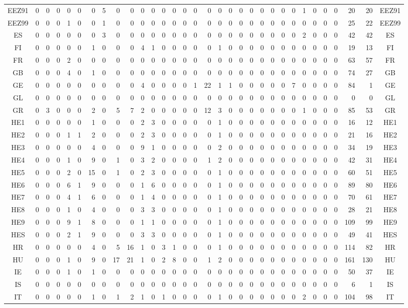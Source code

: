 \documentclass[10pt,a4paper,twoside]{report}
\begin{document}
{\begin{tabular}{crrrrrrrrrrrrrrrrrrrrrrrrrrrrrrc}
EEZ91&0&0&0&0&0&0&5&0&0&0&0&0&0&0&0&0&0&0&0&0&0&0&0&0&1&0&0&0&20&20&EEZ91\\
EEZ99&0&0&0&1&0&0&1&0&0&0&0&0&0&0&0&0&0&0&0&0&0&0&0&0&0&0&0&0&25&22&EEZ99\\
ES&0&0&0&0&0&0&3&0&0&0&0&0&0&0&0&0&0&0&0&0&0&0&0&0&2&0&0&0&42&42&ES\\
FI&0&0&0&0&0&1&0&0&0&4&1&0&0&0&0&0&1&0&0&0&0&0&0&0&0&0&0&0&19&13&FI\\
FR&0&0&0&2&0&0&0&0&0&0&0&0&0&0&0&0&0&0&0&0&0&0&0&0&0&0&0&0&63&57&FR\\
GB&0&0&0&4&0&1&0&0&0&0&0&0&0&0&0&0&0&0&0&0&0&0&0&0&0&0&0&0&74&27&GB\\
GE&0&0&0&0&0&0&0&0&0&4&0&0&0&0&1&22&1&1&0&0&0&0&0&7&0&0&0&0&84&1&GE\\
GL&0&0&0&0&0&0&0&0&0&0&0&0&0&0&0&0&0&0&0&0&0&0&0&0&0&0&0&0&0&0&GL\\
GR&0&3&0&0&0&2&0&5&7&2&0&0&0&0&0&12&3&0&0&0&0&0&0&0&1&0&0&0&85&53&GR\\
HE1&0&0&0&0&0&1&0&0&0&2&3&0&0&0&0&0&1&0&0&0&0&0&0&0&0&0&0&0&16&12&HE1\\
HE2&0&0&0&1&1&2&0&0&0&2&3&0&0&0&0&0&1&0&0&0&0&0&0&0&0&0&0&0&21&16&HE2\\
HE3&0&0&0&0&0&4&0&0&0&9&1&0&0&0&0&0&2&0&0&0&0&0&0&0&0&0&0&0&34&19&HE3\\
HE4&0&0&0&1&0&9&0&1&0&3&2&0&0&0&0&1&2&0&0&0&0&0&0&0&0&0&0&0&42&31&HE4\\
HE5&0&0&0&2&0&15&0&1&0&2&3&0&0&0&0&0&1&0&0&0&0&0&0&0&0&0&0&0&60&51&HE5\\
HE6&0&0&0&6&1&9&0&0&0&1&6&0&0&0&0&0&1&0&0&0&0&0&0&0&0&0&0&0&89&80&HE6\\
HE7&0&0&0&4&1&6&0&0&0&1&4&0&0&0&0&0&1&0&0&0&0&0&0&0&0&0&0&0&70&61&HE7\\
HE8&0&0&0&1&0&4&0&0&0&3&3&0&0&0&0&0&1&0&0&0&0&0&0&0&0&0&0&0&28&21&HE8\\
HE9&0&0&0&9&1&8&0&0&0&1&1&0&0&0&0&0&1&0&0&0&0&0&0&0&0&0&0&0&109&99&HE9\\
HES&0&0&0&2&1&9&0&0&0&3&3&0&0&0&0&0&1&0&0&0&0&0&0&0&0&0&0&0&49&41&HES\\
HR&0&0&0&0&0&4&0&5&16&1&0&3&1&0&0&0&1&0&0&0&0&0&0&0&0&0&0&0&114&82&HR\\
HU&0&0&0&1&0&9&0&17&21&1&0&2&8&0&0&1&2&0&0&0&0&0&0&0&0&0&0&0&161&130&HU\\
IE&0&0&0&1&0&1&0&0&0&0&0&0&0&0&0&0&0&0&0&0&0&0&0&0&0&0&0&0&50&37&IE\\
IS&0&0&0&0&0&0&0&0&0&0&0&0&0&0&0&0&0&0&0&0&0&0&0&0&0&0&0&0&6&1&IS\\
IT&0&0&0&0&0&1&0&1&2&1&0&1&0&0&0&0&1&0&0&0&0&0&0&0&2&0&0&0&104&98&IT\\

\end{tabular}}
\end{document}
